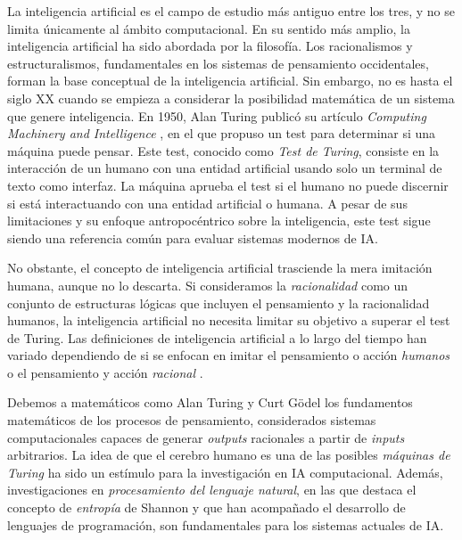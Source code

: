

La inteligencia artificial es el campo de estudio más antiguo entre los tres, y no se limita únicamente al ámbito computacional. En su sentido más amplio, la inteligencia artificial ha sido abordada por la filosofía. Los racionalismos y estructuralismos, fundamentales en los sistemas de pensamiento occidentales, forman la base conceptual de la inteligencia artificial. Sin embargo, no es hasta el siglo XX cuando se empieza a considerar la posibilidad matemática de un sistema que genere inteligencia. En 1950, Alan Turing publicó su artículo \textit{Computing Machinery and Intelligence} \citep{alan1950a}, en el que propuso un test para determinar si una máquina puede pensar. Este test, conocido como \textit{Test de Turing}, consiste en la interacción de un humano con una entidad artificial usando solo un terminal de texto como interfaz. La máquina aprueba el test si el humano no puede discernir si está interactuando con una entidad artificial o humana. A pesar de sus limitaciones y su enfoque antropocéntrico sobre la inteligencia, este test sigue siendo una referencia común para evaluar sistemas modernos de IA.

No obstante, el concepto de inteligencia artificial trasciende la mera imitación humana, aunque no lo descarta. Si consideramos la \textit{racionalidad} como un conjunto de estructuras lógicas que incluyen el pensamiento y la racionalidad humanos, la inteligencia artificial no necesita limitar su objetivo a superar el test de Turing. Las definiciones de inteligencia artificial a lo largo del tiempo han variado dependiendo de si se enfocan en imitar el pensamiento o acción \textit{humanos} o el pensamiento y acción \textit{racional} \citep{RussellStuartJ2021AI:A}.

Debemos a matemáticos como Alan Turing y Curt Gödel los fundamentos matemáticos de los procesos de pensamiento, considerados sistemas computacionales capaces de generar \textit{outputs} racionales a partir de \textit{inputs} arbitrarios. La idea de que el cerebro humano es una de las posibles \textit{máquinas de Turing} \citep{penroseNuevaMenteEmperador2015} ha sido un estímulo para la investigación en IA computacional. Además, investigaciones en \textit{procesamiento del lenguaje natural}, en las que destaca el concepto de \textit{entropía} de Shannon \citep{shannon1951prediction} y que han acompañado el desarrollo de lenguajes de programación, son fundamentales para los sistemas actuales de IA.


